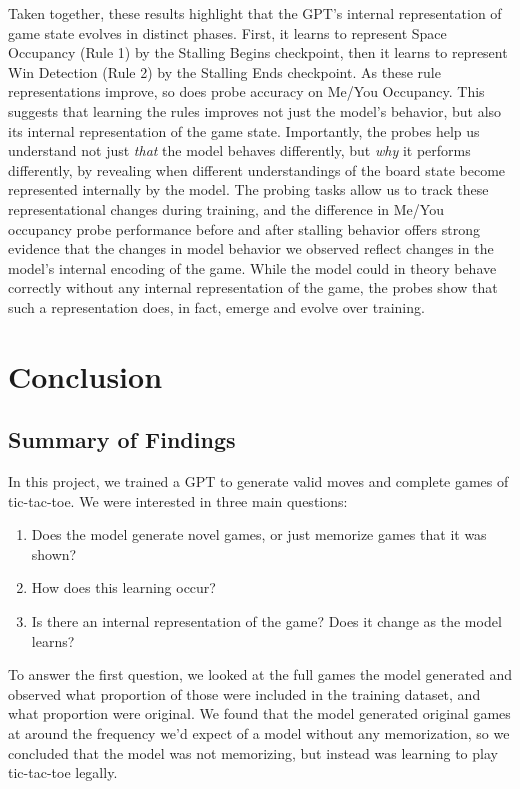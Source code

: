 \documentclass[11pt]{article}
\providecommand{\tightlist}{%
      \setlength{\itemsep}{0pt}\setlength{\parskip}{0pt}}
\begin{document}
Taken together, these results highlight that the GPT's internal
representation of game state evolves in distinct phases. First, it
learns to represent Space Occupancy (Rule 1) by the Stalling Begins
checkpoint, then it learns to represent Win Detection (Rule 2) by the
Stalling Ends checkpoint. As these rule representations improve, so does
probe accuracy on Me/You Occupancy. This suggests that learning the
rules improves not just the model's behavior, but also its internal
representation of the game state. Importantly, the probes help us
understand not just \emph{that} the model behaves differently, but
\emph{why} it performs differently, by revealing when different
understandings of the board state become represented internally by the
model. The probing tasks allow us to track these representational
changes during training, and the difference in Me/You occupancy probe
performance before and after stalling behavior offers strong evidence
that the changes in model behavior we observed reflect changes in the
model's internal encoding of the game. While the model could in theory
behave correctly without any internal representation of the game, the
probes show that such a representation does, in fact, emerge and evolve
over training.

    \section{Conclusion}\label{conclusion}

\subsection{Summary of Findings}\label{summary-of-findings}

In this project, we trained a GPT to generate valid moves and complete
games of tic-tac-toe. We were interested in three main questions:

\begin{enumerate}
\def\labelenumi{\arabic{enumi}.}
\tightlist
\item
  Does the model generate novel games, or just memorize games that it
  was shown?
\item
  How does this learning occur?
\item
  Is there an internal representation of the game? Does it change as the
  model learns?
\end{enumerate}

To answer the first question, we looked at the full games the model
generated and observed what proportion of those were included in the
training dataset, and what proportion were original. We found that the
model generated original games at around the frequency we'd expect of a
model without any memorization, so we concluded that the model was not
memorizing, but instead was learning to play tic-tac-toe legally.
\end{document}
